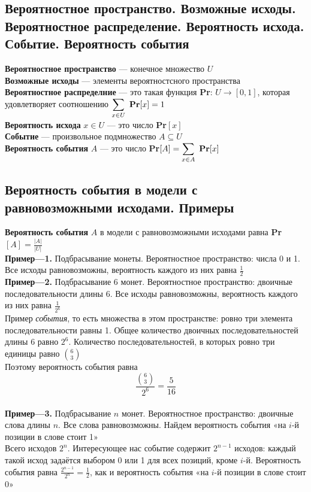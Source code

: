 \documentclass[a4paper]{article}
\begin{document}
\subsection{Вероятностное пространство. Возможные исходы. Вероятностное распределение. Вероятность исхода. Событие. Вероятность события}
\textbf{Вероятностное пространство} — конечное множество $U$\\[2mm]
\indent\textbf{Возможные исходы} — элементы вероятностсного пространства\\[2mm]
\indent\textbf{Вероятностное распределние} — это такая функция \textbf{Pr}: $U\to[0,1]$, которая удовлетворяет соотношению $\displaystyle\sum_{x\in U}\textrm{ \textbf{Pr}}[x]=1$\\[2mm]
\indent\textbf{Вероятность исхода} $x\in U$ — это число \textbf{Pr}$[x]$\\[2mm]
\indent\textbf{Событие} — произвольное подмножество $A\subseteq U$\\[2mm]
\indent\textbf{Вероятность события} $A$ — это число \textbf{Pr}$[A]=\displaystyle\sum_{x\in A}\textrm{ \textbf{Pr}}[x]$

\subsection{Вероятность события в модели с равновозможными исходами. Примеры}
\textbf{Вероятность события} $A$ в модели с равновозможными исходами равна \textbf{Pr}$[A]=\displaystyle\frac{|A|}{|U|}$\\[2mm]
\indent\textbf{Пример—1.} \guillemotleft Подбрасывание монеты\guillemotright. Вероятностное пространство: числа 0 и 1. Все исходы равновозможны, вероятность каждого из них равна $\displaystyle\frac{1}{2}$\\[2mm]
\indent\textbf{Пример—2.} \guillemotleft Подбрасывание 6 монет\guillemotright. Вероятностное пространство: двоичные последовательности длины 6. Все исходы равновозможны, вероятность каждого из них равна $\displaystyle\frac{1}{2^6}$\\[2mm]
\indent Пример \textit{события}, то есть множества в этом пространстве: ровно три элемента последовательности равны 1. Общее количество двоичных последовательностей длины 6 равно $2^6$. Количество последовательностей, в которых ровно три единицы равно $\binom{6}{3}$\\[2mm]
\indent Поэтому вероятность события равна $$\displaystyle\frac{\binom{6}{3}}{2^6}=\frac{5}{16}$$\\[2mm]
\indent\textbf{Пример—3.} \guillemotleft Подбрасывание $n$ монет\guillemotright. Вероятностное пространство: двоичные слова длины $n$. Все слова равновозможны. Найдем вероятность события «на $i$-й позиции в слове стоит 1»\\[2mm]
\indent Всего исходов $2^n$. Интересующее нас событие содержит $2^{n-1}$ исходов: каждый такой исход задаётся выбором 0 или 1 для всех позиций, кроме $i$-й. Вероятность события равна $\displaystyle\frac{2^{n-1}}{2^n}=\displaystyle\frac{1}{2}$, как и вероятность события «на $i$-й позиции в слове стоит 0»
\end{document}
